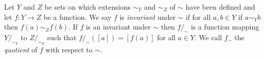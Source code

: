 \documentclass[../paper.tex]{subfiles}
\begin{document}
Let $Y$ and $Z$ be sets on which extensions $\sim_Y$ and $\sim_Z$ of
$\sim$ have been defined and let $f : Y \rightarrow Z$ be a function.  We say $f$
is \emph{invariant} under $\sim$ if for all $a, b \in Y$ if $a \sim_Y b$ then
$f(a) \sim_Z f(b)$. If $f$ is an invariant under $\sim$ then $f /_{\sim}$ is a
function mapping $Y /_{\sim_Y} $ to $ Z /_{\sim_Z}$ such that $f /_{\sim} ([a]) =
[f(a)]$ for all $a \in Y$. We call $f_{\sim}$ the \emph{quotient} of $f$ with
respect to $\sim$.




\end{document}
